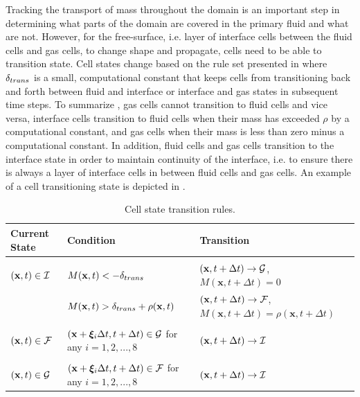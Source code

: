 \documentclass[pdftex,ms]{pittetd}
\newcommand{\pos}{\mathbf{x}}
\newcommand{\pvel}{\boldsymbol{\xi}}
\begin{document}
Tracking the transport of mass throughout the domain is an important step in determining what parts of the domain are covered in the primary fluid and what are not.
However, for the free-surface, i.e. layer of interface cells between the fluid cells and gas cells, to change shape and propagate, cells need to be able to transition state.
Cell states change based on the rule set presented in  where $\delta_{trans}$ is a small, computational constant that keeps cells from transitioning back and forth between fluid and interface or interface and gas states in subsequent time steps.
To summarize , gas cells cannot transition to fluid cells and vice versa, interface cells transition to fluid cells when their mass has exceeded $\rho$ by a computational constant, and gas cells when their mass is less than zero minus a computational constant.
In addition, fluid cells and gas cells transition to the interface state in order to maintain continuity of the interface, i.e. to ensure there is always a layer of interface cells in between fluid cells and gas cells.
An example of a cell transitioning state is depicted in .

\begin{table}
\caption{Cell state transition rules.}
\begin{tabulary}{\linewidth}{l|L|L}
\textbf{Current State} & \textbf{Condition} & \textbf{Transition} \\
\hline &  & \\
$(\pos, t) \in \iset$ & $M(\pos, t) < -\tconst$ & $(\pos, t + \Delta t) \rightarrow \gset$, $M(\pos, t + \Delta t) = 0$ \\
                      & $M(\pos, t) > \tconst + \rho(\pos, t)$ & $(\pos, t + \Delta t) \rightarrow \fset$, $M(\pos, t + \Delta t) = \rho(\pos, t + \Delta t)$ \\
                      &\\
$(\pos, t) \in \fset$ & $(\pos + \pvel_i \Delta t, t + \Delta t) \in \gset$ for any $i = 1, 2, ..., 8$ & $(\pos, t + \Delta t) \rightarrow \iset$ \\
&\\
$(\pos, t) \in \gset$ & $(\pos + \pvel_i \Delta t, t + \Delta t) \in \fset$ for any $i = 1, 2, ..., 8$ & $(\pos, t + \Delta t) \rightarrow \iset$ \\
\end{tabulary}
\label{tab:cell-transition-rules}
\end{table}
\end{document}
